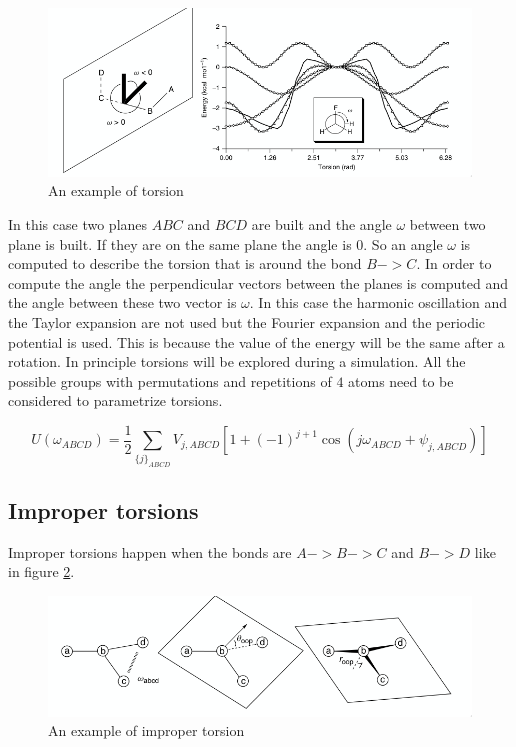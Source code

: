 \begin{figure}[H]
	\includegraphics[width=\textwidth]{torsions}
	\caption{An example of torsion}
	\label{fig:torsions}
\end{figure}

In this case two planes $ABC$ and $BCD$ are built and the angle $\omega$ between two plane is built.
If they are on the same plane the angle is $0$.
So an angle $\omega$ is computed to describe the torsion that is around the bond $B->C$.
In order to compute the angle the perpendicular vectors between the planes is computed and the angle between these two vector is $\omega$.
In this case the harmonic oscillation and the Taylor expansion are not used but the Fourier expansion and the periodic potential is used.
This is because the value of the energy will be the same after a rotation.
In principle torsions will be explored during a simulation.
All the possible groups with permutations and repetitions of $4$ atoms need to be considered to parametrize torsions.

$$U(\omega_{ABCD}) = \frac{1}{2}\sum\limits_{\{j\}_{ABCD}}V_{j,ABCD}[1+(-1)^{j+1}\cos(j\omega_{ABCD}+\psi_{j,ABCD})]$$

	\subsection{Improper torsions}
	Improper torsions happen when the bonds are $A->B->C$ and $B->D$ like in figure \ref{fig:improper-torsions}.

	\begin{figure}[H]
		\includegraphics[width=\textwidth]{improper-torsions}
		\caption{An example of improper torsion}
		\label{fig:improper-torsions}
	\end{figure}

